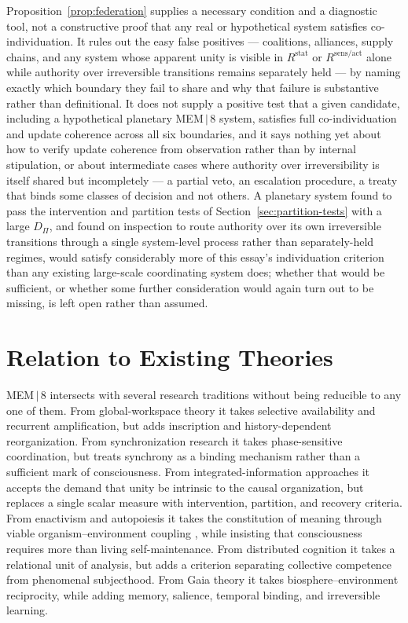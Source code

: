\documentclass[11pt]{article}
\begin{document}
Proposition~\ref{prop:federation} supplies a necessary condition and a diagnostic tool, not a constructive proof that any real or hypothetical system satisfies co-individuation. It rules out the easy false positives --- coalitions, alliances, supply chains, and any system whose apparent unity is visible in $R^{\mathrm{stat}}$ or $R^{\mathrm{sens/act}}$ alone while authority over irreversible transitions remains separately held --- by naming exactly which boundary they fail to share and why that failure is substantive rather than definitional. It does not supply a positive test that a given candidate, including a hypothetical planetary MEM\,$|$\,8 system, satisfies full co-individuation and update coherence across all six boundaries, and it says nothing yet about how to verify update coherence from observation rather than by internal stipulation, or about intermediate cases where authority over irreversibility is itself shared but incompletely --- a partial veto, an escalation procedure, a treaty that binds some classes of decision and not others. A planetary system found to pass the intervention and partition tests of Section~\ref{sec:partition-tests} with a large $D_\Pi$, and found on inspection to route authority over its own irreversible transitions through a single system-level process rather than separately-held regimes, would satisfy considerably more of this essay's individuation criterion than any existing large-scale coordinating system does; whether that would be sufficient, or whether some further consideration would again turn out to be missing, is left open rather than assumed.

\section{Relation to Existing Theories}

MEM\,$|$\,8 intersects with several research traditions without being reducible to any one of them. From global-workspace theory it takes selective availability and recurrent amplification, but adds inscription and history-dependent reorganization. From synchronization research it takes phase-sensitive coordination, but treats synchrony as a binding mechanism rather than a sufficient mark of consciousness. From integrated-information approaches it accepts the demand that unity be intrinsic to the causal organization, but replaces a single scalar measure with intervention, partition, and recovery criteria. From enactivism and autopoiesis it takes the constitution of meaning through viable organism--environment coupling \cite{thompson2004}, while insisting that consciousness requires more than living self-maintenance. From distributed cognition it takes a relational unit of analysis, but adds a criterion separating collective competence from phenomenal subjecthood. From Gaia theory it takes biosphere--environment reciprocity, while adding memory, salience, temporal binding, and irreversible learning.
\end{document}

